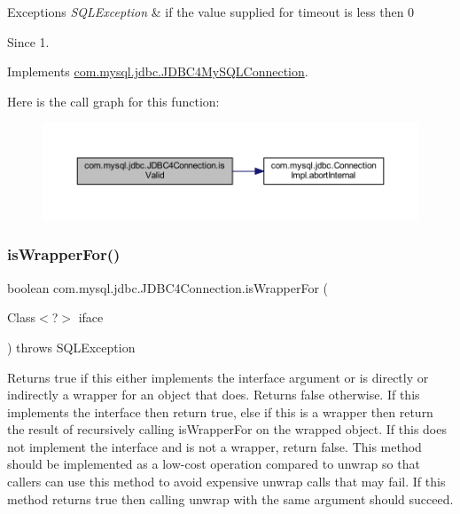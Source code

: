 \begin{DoxyExceptions}{Exceptions}
{\em S\+Q\+L\+Exception} & if the value supplied for {\ttfamily timeout} is less then 0 \\
\hline
\end{DoxyExceptions}
\begin{DoxySince}{Since}
1. 
\end{DoxySince}


Implements \mbox{\hyperlink{interfacecom_1_1mysql_1_1jdbc_1_1_j_d_b_c4_my_s_q_l_connection}{com.\+mysql.\+jdbc.\+J\+D\+B\+C4\+My\+S\+Q\+L\+Connection}}.

Here is the call graph for this function\+:
\nopagebreak
\begin{figure}[H]
\begin{center}
\leavevmode
\includegraphics[width=350pt]{classcom_1_1mysql_1_1jdbc_1_1_j_d_b_c4_connection_a983196178af2e710098d18e8f1b661d8_cgraph}
\end{center}
\end{figure}
\mbox{\label{classcom_1_1mysql_1_1jdbc_1_1_j_d_b_c4_connection_a4c49247c494fead999902d1e8f0921b6}} 
\subsubsection{\texorpdfstring{is\+Wrapper\+For()}{isWrapperFor()}}
{\footnotesize\ttfamily boolean com.\+mysql.\+jdbc.\+J\+D\+B\+C4\+Connection.\+is\+Wrapper\+For (\begin{DoxyParamCaption}\item[{Class$<$?$>$}]{iface }\end{DoxyParamCaption}) throws S\+Q\+L\+Exception}

Returns true if this either implements the interface argument or is directly or indirectly a wrapper for an object that does. Returns false otherwise. If this implements the interface then return true, else if this is a wrapper then return the result of recursively calling {\ttfamily is\+Wrapper\+For} on the wrapped object. If this does not implement the interface and is not a wrapper, return false. This method should be implemented as a low-\/cost operation compared to {\ttfamily unwrap} so that callers can use this method to avoid expensive {\ttfamily unwrap} calls that may fail. If this method returns true then calling {\ttfamily unwrap} with the same argument should succeed.


